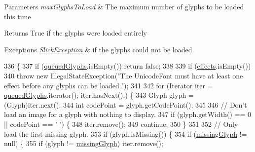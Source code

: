 \begin{DoxyParams}{Parameters}
{\em max\+Glyphs\+To\+Load} & The maximum number of glyphs to be loaded this time \\
\hline
\end{DoxyParams}
\begin{DoxyReturn}{Returns}
True if the glyphs were loaded entirely 
\end{DoxyReturn}

\begin{DoxyExceptions}{Exceptions}
{\em \mbox{\hyperlink{classorg_1_1newdawn_1_1slick_1_1_slick_exception}{Slick\+Exception}}} & if the glyphs could not be loaded. \\
\hline
\end{DoxyExceptions}

\begin{DoxyCode}
336                                                                           \{
337         \textcolor{keywordflow}{if} (\mbox{\hyperlink{classorg_1_1newdawn_1_1slick_1_1_unicode_font_a38f7c7922eba8b5188d7b098b2c1d97f}{queuedGlyphs}}.isEmpty()) \textcolor{keywordflow}{return} \textcolor{keyword}{false};
338 
339         \textcolor{keywordflow}{if} (\mbox{\hyperlink{classorg_1_1newdawn_1_1slick_1_1_unicode_font_a57bc565e86127d8f7c0d7bcfa2f6dc56}{effects}}.isEmpty())
340             \textcolor{keywordflow}{throw} \textcolor{keyword}{new} IllegalStateException(\textcolor{stringliteral}{"The UnicodeFont must have at least one effect before any
       glyphs can be loaded."});
341 
342         \textcolor{keywordflow}{for} (Iterator iter = \mbox{\hyperlink{classorg_1_1newdawn_1_1slick_1_1_unicode_font_a38f7c7922eba8b5188d7b098b2c1d97f}{queuedGlyphs}}.iterator(); iter.hasNext();) \{
343             Glyph glyph = (Glyph)iter.next();
344             \textcolor{keywordtype}{int} codePoint = glyph.getCodePoint();
345 
346             \textcolor{comment}{// Don't load an image for a glyph with nothing to display.}
347             \textcolor{keywordflow}{if} (glyph.getWidth() == 0 || codePoint == \textcolor{charliteral}{' '}) \{
348                 iter.remove();
349                 \textcolor{keywordflow}{continue};
350             \}
351 
352             \textcolor{comment}{// Only load the first missing glyph.}
353             \textcolor{keywordflow}{if} (glyph.isMissing()) \{
354                 \textcolor{keywordflow}{if} (\mbox{\hyperlink{classorg_1_1newdawn_1_1slick_1_1_unicode_font_aafcdf9a0998520fd22c42754b10c9fcf}{missingGlyph}} != null) \{
355                     \textcolor{keywordflow}{if} (glyph != \mbox{\hyperlink{classorg_1_1newdawn_1_1slick_1_1_unicode_font_aafcdf9a0998520fd22c42754b10c9fcf}{missingGlyph}}) iter.remove();

\end{DoxyCode}
